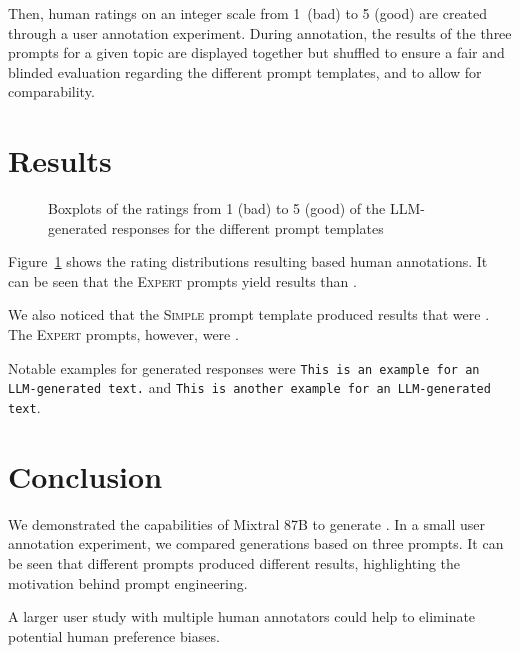 \documentclass[11pt]{article}
\begin{document}
Then, human ratings on an integer scale from 1~(bad) to 5 (good) are created through a user annotation experiment. During annotation, the results of the three prompts for a given topic are displayed together but shuffled to ensure a fair and blinded evaluation regarding the different prompt templates, and to allow for comparability.


\section{Results}
\begin{figure}\centering
  
  \caption{Boxplots of the ratings from 1 (bad) to 5 (good) of the LLM-generated responses for the different prompt templates}
  \label{fig:boxplots}
\end{figure}


Figure~\ref{fig:boxplots} shows the rating distributions resulting based human annotations.
It can be seen that the \textsc{Expert} prompts yield  results than .

We also noticed that the \textsc{Simple} prompt template produced results that were . The \textsc{Expert} prompts, however, were .

Notable examples for generated responses were \texttt{This is an example for an LLM-generated text.}\todo{} and  \texttt{This is another example for an LLM-generated text}\todo{}.


\section{Conclusion}

We demonstrated the capabilities of Mixtral 8\texttimes 7B to generate . In a small user annotation experiment, we compared generations based on three prompts.
It can be seen that different prompts produced different results, highlighting the motivation behind prompt engineering.

A larger user study with multiple human annotators could help to eliminate potential human preference biases.


\end{document}
